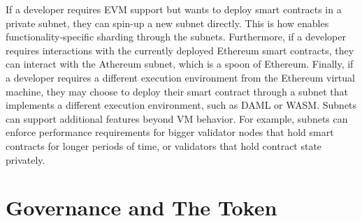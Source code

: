 \documentclass[runningheads]{llncs}
\begin{document}

If a developer requires EVM support but wants to deploy smart contracts in a private subnet, they can spin-up a new subnet directly. This is how \AVAPlatformName{} enables functionality-specific sharding through the subnets. Furthermore, if a developer requires interactions with the currently deployed Ethereum smart contracts, they can interact with the Athereum subnet, which is a spoon of Ethereum. 
Finally, if a developer requires a different execution environment from the Ethereum virtual machine, they may choose to deploy their smart contract through a subnet that implements a different execution environment, such as DAML or WASM. 
Subnets can support additional features beyond VM behavior. For example, subnets can enforce performance requirements for bigger validator nodes that hold smart contracts for longer periods of time, or validators that hold contract state privately. 

\section{Governance and The \AVATokenName{} Token}
\label{section:governance_and_token}
\end{document}
